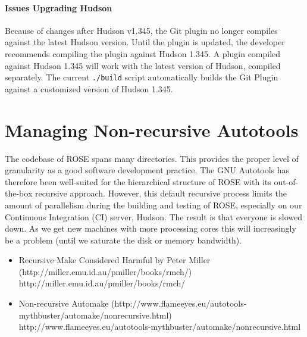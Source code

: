 \paragraph{Issues Upgrading Hudson}
Because of changes after Hudson v1.345, the Git plugin no longer
compiles against the latest Hudson version. Until the plugin is updated, the
developer recommends compiling the plugin against Hudson 1.345. A plugin 
compiled against Hudson 1.345 will work with the latest version of Hudson, compiled
separately. The current \texttt{./build} script automatically builds the
Git Plugin against a customized version of Hudson 1.345. 




%

    \section{Managing Non-recursive Autotools}

%
The codebase of ROSE spans many directories. This provides the proper level of
granularity as a good software development practice. The GNU Autotools has therefore
been well-suited for the hierarchical structure of ROSE with its out-of-the-box
recursive approach.
\newline\newline
However, this default recursive process limits the amount of parallelism during the
building and testing of ROSE, especially on our Continuous Integration (CI) server,
Hudson. The result is that everyone is slowed down. As we get new machines with more
processing cores this will increasingly be a problem (until we saturate the disk or memory
bandwidth).

\begin{itemize}
  \item{
        \htmladdnormallink
        {Recursive Make Considered Harmful by Peter Miller (http://miller.emu.id.au/pmiller/books/rmch/)}
        {http://miller.emu.id.au/pmiller/books/rmch/}}
  \item{
        \htmladdnormallink
        {Non-recursive Automake (http://www.flameeyes.eu/autotools-mythbuster/automake/nonrecursive.html)}
        {http://www.flameeyes.eu/autotools-mythbuster/automake/nonrecursive.html}}
\end{itemize}

%


